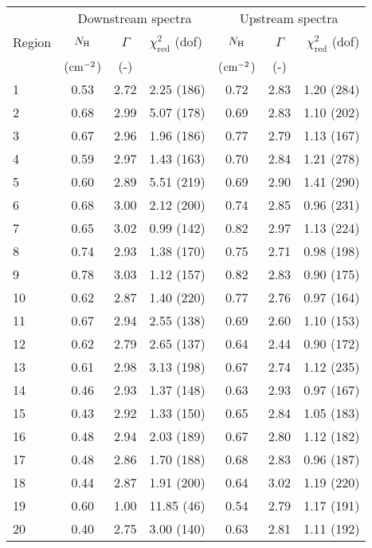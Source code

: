 \begin{tabular}{@{}lcclccr@{}}
\toprule
{} & \multicolumn{3}{c}{Downstream spectra}
   & \multicolumn{3}{c}{Upstream spectra} \\
\cmidrule(lr){2-4} \cmidrule(l){5-7}
Region & $N_{\mathrm{H}}$ & $\Gamma$ & $\chi^2_{\mathrm{red}}$ (dof)
       & $N_{\mathrm{H}}$ & $\Gamma$ & $\chi^2_{\mathrm{red}}$ (dof) \\
{} & ($\mathrm{cm}^{-2}$) & (-) & {}
   & ($\mathrm{cm}^{-2}$) & (-) & {} \\
\midrule
1  & 0.53 & 2.72 & 2.25 (186) & 0.72 & 2.83 & 1.20 (284) \\
2  & 0.68 & 2.99 & 5.07 (178) & 0.69 & 2.83 & 1.10 (202) \\
3  & 0.67 & 2.96 & 1.96 (186) & 0.77 & 2.79 & 1.13 (167) \\
\cmidrule{1-7}
4  & 0.59 & 2.97 & 1.43 (163) & 0.70 & 2.84 & 1.21 (278) \\
5  & 0.60 & 2.89 & 5.51 (219) & 0.69 & 2.90 & 1.41 (290) \\
6  & 0.68 & 3.00 & 2.12 (200) & 0.74 & 2.85 & 0.96 (231) \\
7  & 0.65 & 3.02 & 0.99 (142) & 0.82 & 2.97 & 1.13 (224) \\
8  & 0.74 & 2.93 & 1.38 (170) & 0.75 & 2.71 & 0.98 (198) \\
9  & 0.78 & 3.03 & 1.12 (157) & 0.82 & 2.83 & 0.90 (175) \\
10 & 0.62 & 2.87 & 1.40 (220) & 0.77 & 2.76 & 0.97 (164) \\
\cmidrule{1-7}
11 & 0.67 & 2.94 & 2.55 (138) & 0.69 & 2.60 & 1.10 (153) \\
12 & 0.62 & 2.79 & 2.65 (137) & 0.64 & 2.44 & 0.90 (172) \\
13 & 0.61 & 2.98 & 3.13 (198) & 0.67 & 2.74 & 1.12 (235) \\
\cmidrule{1-7}
14 & 0.46 & 2.93 & 1.37 (148) & 0.63 & 2.93 & 0.97 (167) \\
15 & 0.43 & 2.92 & 1.33 (150) & 0.65 & 2.84 & 1.05 (183) \\
16 & 0.48 & 2.94 & 2.03 (189) & 0.67 & 2.80 & 1.12 (182) \\
17 & 0.48 & 2.86 & 1.70 (188) & 0.68 & 2.83 & 0.96 (187) \\
\cmidrule{1-7}
18 & 0.44 & 2.87 & 1.91 (200) & 0.64 & 3.02 & 1.19 (220) \\
19 & 0.60 & 1.00 & 11.85 (46) & 0.54 & 2.79 & 1.17 (191) \\
20 & 0.40 & 2.75 & 3.00 (140) & 0.63 & 2.81 & 1.11 (192) \\
\bottomrule
\end{tabular}
